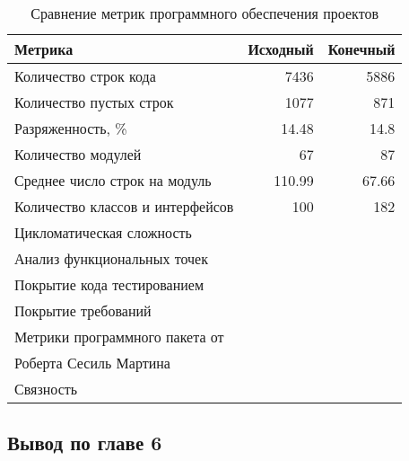     \begin{table}[!h]
        \caption{Сравнение метрик программного обеспечения проектов}
        \begin{center}
            \begin{tabular}{l|r|r}
                \textbf{Метрика} & \textbf{Исходный} & \textbf{Конечный} \\
                \hline
                Количество строк кода               & 7436 & 5886 \\
                Количество пустых строк             & 1077 & 871 \\
                Разряженность, \%                   & 14.48 & 14.8 \\
                Количество модулей                  & 67 & 87 \\
                Среднее число строк на модуль       & 110.99 & 67.66 \\
                Количество классов и интерфейсов    & 100 & 182 \\
                Цикломатическая сложность           & & \\
                Анализ функциональных точек         & & \\
                Покрытие кода тестированием         & & \\
                Покрытие требований                 & & \\
                Метрики программного пакета от      & & \\
                Роберта Сесиль Мартина              & & \\
                Связность                           & & \\
            \end{tabular}
        \end{center}
    \end{table}

    \subsection*{Вывод по главе 6}
